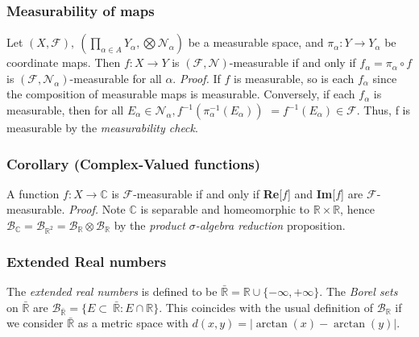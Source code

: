 \documentclass{article}
\begin{document}
\subsubsection{Measurability of maps}
Let $(X,\mathcal{F}), \ (\prod_{\alpha\in A}Y_\alpha, \bigotimes\mathcal{N}_\alpha)$ be a measurable space, and $\pi_\alpha:Y\to Y_\alpha$ be coordinate maps. Then $f:X\to Y$ is $(\mathcal{F},\mathcal{N})$-measurable if and only if $f_\alpha=\pi_\alpha \circ f$ is $(\mathcal{F},\mathcal{N}_\alpha)$-measurable for all $\alpha$. \newline \newline
\textit{Proof.} \newline \newline
If $f$ is measurable, so is each $f_\alpha$ since the composition of measurable maps is measurable. Conversely, if each $f_\alpha$ is measurable, then for all $E_\alpha\in \mathcal{N}_\alpha, $$ f^{-1}(\pi_\alpha^{-1}(E_\alpha)) $ $= f^{-1}(E_\alpha)\in \mathcal{F}$. Thus, f is measurable by the \emph{measurability check}.
\newline \newline


\subsubsection{Corollary (Complex-Valued functions)}
A function $f:X\to \mathbb{C}$ is $\mathcal{F}$-measurable if and only if \textbf{Re}[$f$] and \textbf{Im}[$f$] are $\mathcal{F}$-measurable.\newline \newline
\textit{Proof.}\newline \newline
Note $\mathbb{C}$ is separable and homeomorphic to $\mathbb{R}\times\mathbb{R}$, hence $\mathcal{B}_\mathbb{C}=\mathcal{B}_{\mathbb{R}^2}=\mathcal{B}_\mathbb{R}\otimes\mathcal{B}_\mathbb{R}$ by the \emph{product $\sigma$-algebra reduction} proposition.
\subsubsection{Extended Real numbers}
The \emph{extended real numbers} is defined to be $\bar{\mathbb{R}}=\mathbb{R}\cup\{-\infty,+\infty\}$. The \emph{Borel sets} on $\bar{\mathbb{R}}$ are $\mathcal{B}_{\bar{\mathbb{R}}}= \{E\subset\ \bar{\mathbb{R}}:E\cap\mathbb{R}\}$. This coincides with the usual definition of $\mathcal{B}_\mathbb{R}$ if we consider $\bar{\mathbb{R}}$ as a metric space with $d(x,y)=|\arctan(x)-\arctan(y)|$. 
\end{document}
